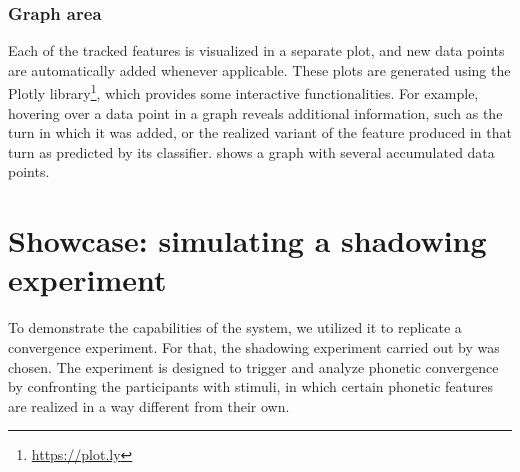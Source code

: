 \subsubsection{Graph area}
\label{subsubsec:graph_area}

Each of the tracked features is visualized in a separate plot, and new data points are automatically added whenever applicable.
These plots are generated using the Plotly library\footnote{\url{https://plot.ly}}, which provides some interactive functionalities.
For example, hovering over a data point in a graph reveals additional information, such as the turn in which it was added, or the realized variant of the feature produced in that turn as predicted by its classifier.
 shows a graph with several accumulated data points.

%

\section{Showcase: simulating a shadowing experiment}
\label{sec:showcase}

To demonstrate the capabilities of the system, we utilized it to replicate a convergence experiment.
For that, the shadowing experiment carried out by \citet{Gessinger2017Interspeech} was chosen.
The experiment is designed to trigger and analyze phonetic convergence by confronting the participants with stimuli, in which certain phonetic features are realized in a way different from their own.

